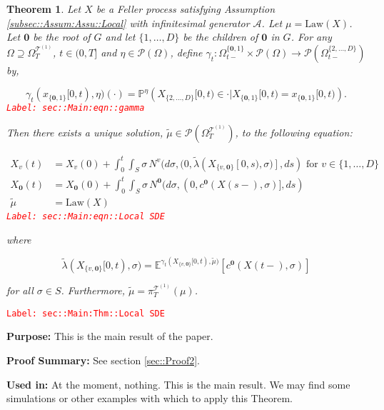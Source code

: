 \documentclass[12pt]{article}
\newcommand{\mb}{\mathbb}
\newcommand{\mc}{\mathcal}
\newcommand{\ra}{\rightarrow}
\newcommand{\te}{\text}
\newcommand{\tr}{\textcolor{red}}
\newcommand{\labe}[1]{\tr{\texttt{Label: #1}}}
\newcommand{\purpose}{\textbf{Purpose: }}
\newcommand{\pfsum}{\textbf{Proof Summary: }}
\newcommand{\usein}{\textbf{Used in: }}
\newcommand{\pr}{\mb{P}}							%
\newcommand{\exmu}[2]{\mb{E}^{#1}\left[#2\right]}	%
\newcommand{\pmsr}{\mc{P}}							%
\renewcommand{\root}{\mathbf{0}}				%
\renewcommand{\v}{v}							%
\renewcommand{\S}{S}							%
\newcommand{\s}{\sigma}							%
\newcommand{\T}{T}								%
\newcommand{\x}{x}								%
\renewcommand{\t}{t}							%
\newcommand{\sset}{\Omega}						%
\newcommand{\proj}{\pi}							%
\renewcommand{\tt}{s}							%
\newcommand{\X}{X}								%
\newcommand{\IG}{\mc{A}}						%
\newcommand{\IGr}{c}							%
\newcommand{\vind}[1]{^{#1}}					%
\newcommand{\vsi}[1]{^{#1}}						%
\newcommand{\cind}[1]{_{#1}}					%
\newcommand{\tp}[1]{(#1)}						%
\newcommand{\tip}[1]{#1}						%
\newcommand{\ts}[1]{_{#1}}						%
\newcommand{\degr}{D}							%
\newcommand{\tree}{\mc{T}}						%
\newcommand{\sln}[1]{^{(#1)}}					%
\newcommand{\poiss}{N}							%
\newcommand{\alt}[1]{\widetilde{#1}}			%
\newcommand{\m}{\mu}							%
\newcommand{\mmm}{\eta}							%
\newcommand{\cm}{\gamma}						%
\newcommand{\law}{\te{Law}}						%
\newcommand{\me}[1]{^{#1}}						%
\newcommand{\crate}{\alt{\lambda}}				%
\newtheorem{thms}{Theorem}[section]
\begin{document}
\begin{thms}
Let \(\X\) be a Feller process satisfying Assumption \ref{subsec::Assum:Assu::Local} with infinitesimal generator \(\IG\). Let \(\m = \law(\X)\). Let \(\root\) be the root of \(G\) and let \(\{1,\dots,\degr\}\) be the children of \(\root\) in \(G\). For any \(\sset \supseteq\sset\vsi{\tree\sln{1}}\ts{\T}\), \(\t\in (0,\T]\) and \(\mmm \in \pmsr(\sset)\), define \(\cm\ts{\t}:\sset\vsi{\{\root,1\}}\ts{\t-}\times \pmsr(\sset) \ra \pmsr(\sset\vsi{\{2,\dots,\degr\}}\ts{\t-})\) by,

\begin{equation}
\cm\ts{\t}(\x\cind{\{\root,1\}}\tip{[0,\t)},\mmm)(\cdot) = \pr\me{\mmm}\left(\X\cind{\{2,\dots,\degr\}}\tip{[0,\t)} \in \cdot|\X\cind{\{\root,1\}}\tip{[0,\t)} = \x\cind{\{\root,1\}}\tip{[0,\t)}\right).
\label{sec::Main:eqn::gamma}
\end{equation}
\labe{sec::Main:eqn::gamma}

Then there exists a unique solution, \(\alt{\m} \in \pmsr(\sset\vsi{\tree\sln{1}}\ts{\T})\), to the following equation:

\begin{align}
\X\cind{\v}\tp{\t} &= \X\cind{\v}\tp{0} + \int_0^\t\int_\S \s\,\poiss\vind{\v}(d\s,(0,\crate(\X\cind{\{\v,\root\}}\tip{[0,\tt)},\s)],d\tt) \te{ for } \v \in \{1,\dots,\degr\}\nonumber\\
\X\cind{\root}\tp{\t} &= \X\cind{\root}\tp{0} + \int_0^\t\int_\S \s\,\poiss\vind{\root}(d\s,(0,\IGr\vind{\root}(\X\tp{\tt-},\s)],d\tt)\nonumber\\
\alt{\m} &= \law(\X)
\label{sec::Main:eqn::Local SDE}
\end{align}
\labe{sec::Main:eqn::Local SDE}

where

\[\crate(\X\cind{\{\v,\root\}}\tip{[0,\t)},\s) = \exmu{\cm\ts{\t}(\X\cind{\{\v,\root\}}\tip{[0,\t)},\alt{\m})}{\IGr\vind{\root}(\X\tp{\t-},\s)}\]

for all \(\s\in \S\). Furthermore, \(\alt{\m} = \proj\vsi{\tree\sln{1}}\ts{\T}(\m)\).
\label{sec::Main:Thm::Local SDE}
\end{thms}
\labe{sec::Main:Thm::Local SDE}

\purpose This is the main result of the paper. 

\pfsum See section \ref{sec::Proof2}.

\usein At the moment, nothing. This is the main result. We may find some simulations or other examples with which to apply this Theorem.
\end{document}
